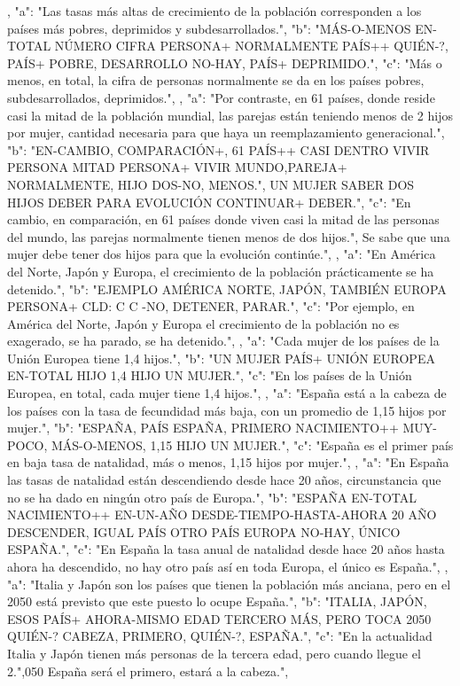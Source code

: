 ,
{
"a": "Las tasas más altas de crecimiento de la población corresponden a los países más pobres, deprimidos y subdesarrollados.",
"b": "MÁS-O-MENOS EN-TOTAL NÚMERO CIFRA PERSONA+ NORMALMENTE PAÍS++ QUIÉN-?, PAÍS+ POBRE, DESARROLLO NO-HAY, PAÍS+ DEPRIMIDO.",
"c": "Más o menos, en total, la cifra de personas normalmente se da en los países pobres, subdesarrollados, deprimidos.",
}
,
{
"a": "Por contraste, en 61 países, donde reside casi la mitad de la población mundial, las parejas están teniendo menos de 2 hijos por mujer, cantidad necesaria para que haya un reemplazamiento generacional.",
"b": "EN-CAMBIO, COMPARACIÓN+, 61 PAÍS++ CASI DENTRO VIVIR PERSONA MITAD PERSONA+ VIVIR MUNDO,PAREJA+ NORMALMENTE, HIJO DOS-NO, MENOS.", UN MUJER SABER DOS HIJOS DEBER PARA EVOLUCIÓN CONTINUAR+ DEBER.",
"c": "En cambio, en comparación, en 61 países donde viven casi la mitad de las personas del mundo, las parejas normalmente tienen menos de dos hijos.", Se sabe que una mujer debe tener dos hijos para que la evolución continúe.",
}
,
{
"a": "En América del Norte, Japón y Europa, el crecimiento de la población prácticamente se ha detenido.",
"b": "EJEMPLO AMÉRICA NORTE, JAPÓN, TAMBIÉN EUROPA PERSONA+ CLD: C C -NO, DETENER, PARAR.",
"c": "Por ejemplo, en América del Norte, Japón y Europa el crecimiento de la población no es exagerado, se ha parado, se ha detenido.",
}
,
{
"a": "Cada mujer de los países de la Unión Europea tiene 1,4 hijos.",
"b": "UN MUJER PAÍS+ UNIÓN EUROPEA EN-TOTAL HIJO 1,4 HIJO UN MUJER.",
"c": "En los países de la Unión Europea, en total, cada mujer tiene 1,4 hijos.",
}
,
{
"a": "España está a la cabeza de los países con la tasa de fecundidad más baja, con un promedio de 1,15 hijos por mujer.",
"b": "ESPAÑA, PAÍS ESPAÑA, PRIMERO NACIMIENTO++ MUY-POCO, MÁS-O-MENOS, 1,15 HIJO UN MUJER.",
"c": "España es el primer país en baja tasa de natalidad, más o menos, 1,15 hijos por mujer.",
}
,
{
"a": "En España las tasas de natalidad están descendiendo desde hace 20 años, circunstancia que no se ha dado en ningún otro país de Europa.",
"b": "ESPAÑA EN-TOTAL NACIMIENTO++ EN-UN-AÑO DESDE-TIEMPO-HASTA-AHORA 20 AÑO DESCENDER, IGUAL PAÍS OTRO PAÍS EUROPA NO-HAY, ÚNICO ESPAÑA.",
"c": "En España la tasa anual de natalidad desde hace 20 años hasta ahora ha descendido, no hay otro país así en toda Europa, el único es España.",
}
,
{
"a": "Italia y Japón son los países que tienen la población más anciana, pero en el 2050 está previsto que este puesto lo ocupe España.",
"b": "ITALIA, JAPÓN, ESOS PAÍS+ AHORA-MISMO EDAD TERCERO MÁS, PERO TOCA 2050 QUIÉN-? CABEZA, PRIMERO, QUIÉN-?, ESPAÑA.",
"c": "En la actualidad Italia y Japón tienen más personas de la tercera edad, pero cuando llegue el 2.",050 España será el primero, estará a la cabeza.",
}
